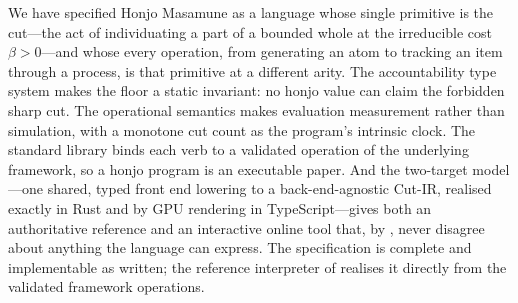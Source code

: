 \documentclass[11pt,a4paper]{article}
\theoremstyle{thmstyle}
\theoremstyle{definition}
\theoremstyle{remark}
\newcommand{\flo}{\beta}
\begin{document}
We have specified Honjo Masamune as a language whose single primitive is
the cut---the act of individuating a part of a bounded whole at the
irreducible cost $\flo>0$---and whose every operation, from generating an
atom to tracking an item through a process, is that primitive at a
different arity. The accountability type system makes the floor a static
invariant: no honjo value can claim the forbidden sharp cut. The
operational semantics makes evaluation measurement rather than
simulation, with a monotone cut count as the program's intrinsic clock.
The standard library binds each verb to a validated operation of the
underlying framework, so a honjo program is an executable paper. And the
two-target model---one shared, typed front end lowering to a
back-end-agnostic Cut-IR, realised exactly in Rust and by GPU rendering in
TypeScript---gives both an authoritative reference and an interactive
online tool that, by , never disagree about
anything the language can express. The specification is complete and
implementable as written; the reference interpreter of 
realises it directly from the validated framework operations.



\end{document}

